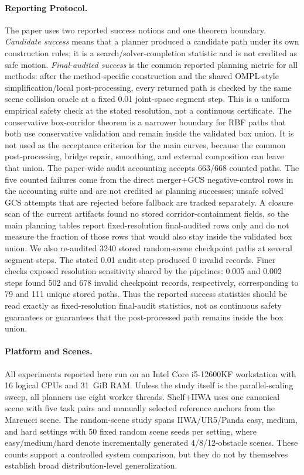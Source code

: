 \documentclass[journal]{IEEEtran}
\DeclareRobustCommand{\textsc}[1]{\textnormal{\MakeUppercase{#1}}}
\newcommand{\rbf}{\textsc{RBF}}
\begin{document}
\paragraph{Reporting Protocol.}
The paper uses two reported success notions and one theorem boundary.
\emph{Candidate success} means that a planner produced a candidate path under
its own construction rules; it is a search/solver-completion statistic and is
not credited as safe motion. \emph{Final-audited success} is the common reported
planning metric for all methods: after the method-specific construction and the
shared OMPL-style simplification/local post-processing, every returned path is
checked by the same scene collision oracle at a fixed 0.01 joint-space segment
step. This is a uniform empirical safety check at the stated resolution, not a
continuous certificate. The conservative box-corridor theorem is a narrower
boundary for \rbf{} paths that both use conservative validation and remain
inside the validated box union. It is not used as the acceptance criterion for
the main curves, because the common post-processing, bridge repair, smoothing,
and external composition can leave that union. The
paper-wide audit accounting accepts 663/668 counted paths. The five counted
failures come from the direct merger+GCS negative-control rows in the accounting
suite and are not credited as planning successes; unsafe solved GCS attempts
that are rejected before fallback are tracked separately. A closure scan of the
current artifacts found no stored corridor-containment fields, so the main
planning tables report fixed-resolution final-audited rows only and do not
measure the fraction of those rows that would also stay inside the validated
box union. We also re-audited 3240 stored random-scene
checkpoint paths at several segment steps. The stated 0.01 audit step produced
0 invalid records. Finer checks exposed resolution sensitivity shared by the
pipelines: 0.005 and 0.002 steps found 502 and 678 invalid checkpoint records,
respectively, corresponding to 79 and 111 unique stored paths. Thus the reported
success statistics should be read exactly as fixed-resolution final-audit
statistics, not as continuous safety guarantees or guarantees that the
post-processed path remains inside the box union.

\paragraph{Platform and Scenes.}
All experiments reported here run on an Intel Core i5-12600KF workstation with
16 logical CPUs and 31~GiB RAM. Unless the study itself is the parallel-scaling
sweep, all planners use eight worker threads. Shelf+IIWA uses one canonical
scene with five task pairs and manually selected reference anchors from the
Marcucci scene. The random-scene study spans IIWA/UR5/Panda easy,
medium, and hard settings with 50 fixed random scene seeds per setting, where
easy/medium/hard denote incrementally generated 4/8/12-obstacle scenes. These
counts support a controlled system comparison, but they do not by themselves
establish broad distribution-level generalization.
\end{document}
